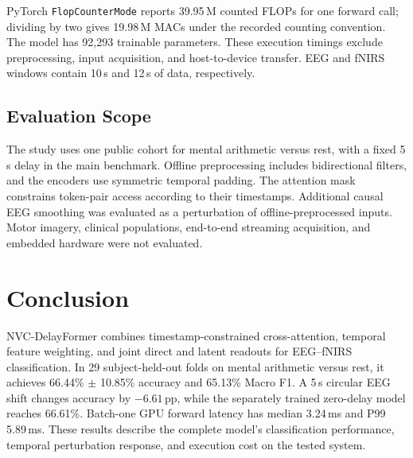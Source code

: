 \documentclass[journal]{IEEEtran}
\begin{document}
PyTorch \texttt{FlopCounterMode} reports 39.95\,M counted FLOPs for one forward call; dividing by two gives 19.98\,M MACs under the recorded counting convention. The model has 92,293 trainable parameters. These execution timings exclude preprocessing, input acquisition, and host-to-device transfer. EEG and fNIRS windows contain 10\,s and 12\,s of data, respectively.

\subsection{Evaluation Scope}
The study uses one public cohort for mental arithmetic versus rest, with a fixed 5\,s delay in the main benchmark. Offline preprocessing includes bidirectional filters, and the encoders use symmetric temporal padding. The attention mask constrains token-pair access according to their timestamps. Additional causal EEG smoothing was evaluated as a perturbation of offline-preprocessed inputs. Motor imagery, clinical populations, end-to-end streaming acquisition, and embedded hardware were not evaluated.

\section{Conclusion}
NVC-DelayFormer combines timestamp-constrained cross-attention, temporal feature weighting, and joint direct and latent readouts for EEG--fNIRS classification. In 29 subject-held-out folds on mental arithmetic versus rest, it achieves 66.44\% $\pm$ 10.85\% accuracy and 65.13\% Macro F1. A 5\,s circular EEG shift changes accuracy by $-6.61$\,pp, while the separately trained zero-delay model reaches 66.61\%. Batch-one GPU forward latency has median 3.24\,ms and P99 5.89\,ms. These results describe the complete model's classification performance, temporal perturbation response, and execution cost on the tested system.

\raggedbottom


\end{document}
